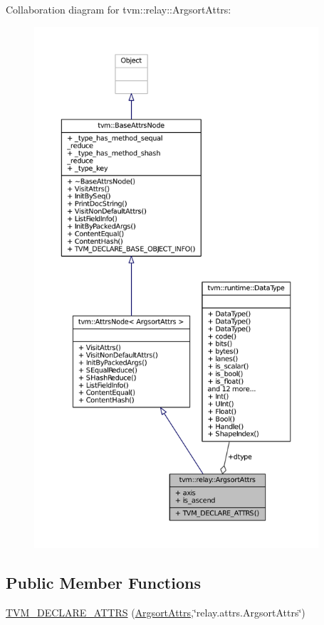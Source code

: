 Collaboration diagram for tvm\+:\+:relay\+:\+:Argsort\+Attrs\+:
\nopagebreak
\begin{figure}[H]
\begin{center}
\leavevmode
\includegraphics[height=550pt]{structtvm_1_1relay_1_1ArgsortAttrs__coll__graph}
\end{center}
\end{figure}
\subsection*{Public Member Functions}
\begin{DoxyCompactItemize}
\item 
\hyperlink{structtvm_1_1relay_1_1ArgsortAttrs_a867e4a526a4b5e2512e658839d6c1a9e}{T\+V\+M\+\_\+\+D\+E\+C\+L\+A\+R\+E\+\_\+\+A\+T\+T\+RS} (\hyperlink{structtvm_1_1relay_1_1ArgsortAttrs}{Argsort\+Attrs},\char`\"{}relay.\+attrs.\+Argsort\+Attrs\char`\"{})
\end{DoxyCompactItemize}
